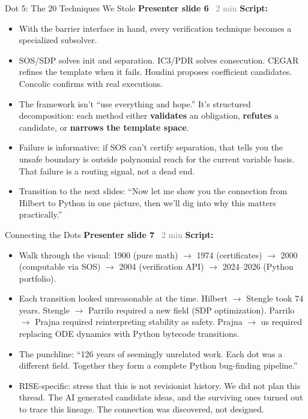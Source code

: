 \documentclass[aspectratio=169]{beamer}
\newcommand{\syncline}[2]{\textbf{#1} \hfill \textcolor{gray}{#2}}
\begin{document}
\begin{frame}{Dot 5: The 20 Techniques We Stole}
\syncline{Presenter slide 6}{~2 min}
\textbf{Script:}
\begin{itemize}
  \item With the barrier interface in hand, every verification technique becomes a specialized subsolver.
  \item SOS/SDP solves init and separation. IC3/PDR solves consecution. CEGAR refines the template when it fails. Houdini proposes coefficient candidates. Concolic confirms with real executions.
  \item The framework isn't ``use everything and hope.'' It's structured decomposition: each method either \textbf{validates} an obligation, \textbf{refutes} a candidate, or \textbf{narrows the template space}.
  \item Failure is informative: if SOS can't certify separation, that tells you the unsafe boundary is outside polynomial reach for the current variable basis. That failure is a routing signal, not a dead end.
  \item Transition to the next slides: ``Now let me show you the connection from Hilbert to Python in one picture, then we'll dig into why this matters practically.''
\end{itemize}
\end{frame}


\begin{frame}{Connecting the Dots}
\syncline{Presenter slide 7}{~2 min}
\textbf{Script:}
\begin{itemize}
  \item Walk through the visual: 1900 (pure math) $\to$ 1974 (certificates) $\to$ 2000 (computable via SOS) $\to$ 2004 (verification API) $\to$ 2024--2026 (Python portfolio).
  \item Each transition looked unreasonable at the time. Hilbert $\to$ Stengle took 74 years. Stengle $\to$ Parrilo required a new field (SDP optimization). Parrilo $\to$ Prajna required reinterpreting stability as safety. Prajna $\to$ us required replacing ODE dynamics with Python bytecode transitions.
  \item The punchline: ``126 years of seemingly unrelated work. Each dot was a different field. Together they form a complete Python bug-finding pipeline.''
  \item RISE-specific: stress that this is not revisionist history. We did not plan this thread. The AI generated candidate ideas, and the surviving ones turned out to trace this lineage. The connection was discovered, not designed.
\end{itemize}
\end{frame}
\end{document}
